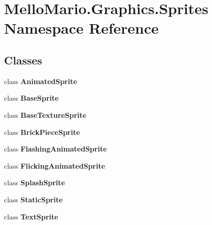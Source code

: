 \section{Mello\+Mario.\+Graphics.\+Sprites Namespace Reference}
\label{namespaceMelloMario_1_1Graphics_1_1Sprites}
\subsection*{Classes}
\begin{DoxyCompactItemize}
\item 
class \textbf{ Animated\+Sprite}
\item 
class \textbf{ Base\+Sprite}
\item 
class \textbf{ Base\+Texture\+Sprite}
\item 
class \textbf{ Brick\+Piece\+Sprite}
\item 
class \textbf{ Flashing\+Animated\+Sprite}
\item 
class \textbf{ Flicking\+Animated\+Sprite}
\item 
class \textbf{ Splash\+Sprite}
\item 
class \textbf{ Static\+Sprite}
\item 
class \textbf{ Text\+Sprite}
\end{DoxyCompactItemize}
